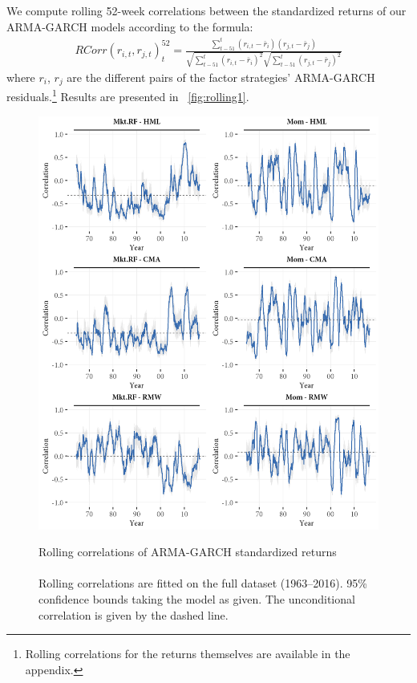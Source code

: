 We compute rolling 52-week correlations between the standardized returns of our ARMA-GARCH models according to the formula: 
\begin{align}
    RCorr(r_{i, t}, r_{j, t})_t^{52} = \frac{\sum^{t}_{t-51}(r_{i, t} - \bar{r}_i)(r_{j,t} - \bar{r}_j)}{\sqrt{\sum^{t}_{t-51} (r_{i,t} - \bar{r}_i)^2} \sqrt{\sum^{t}_{t-51} (r_{j,t} - \bar{r}_j)^2}}
\end{align}
where $r_i$, $r_j$ are the different pairs of the factor strategies' ARMA-GARCH residuals.\footnote{Rolling correlations for the returns themselves are available in the appendix.} Results are presented in ~\autoref{fig:rolling1}.
\begin{figure}[!ht]
  \centering
  \caption{Rolling correlations of ARMA-GARCH standardized returns \\ \quad \\
   Rolling correlations are fitted on the full dataset (1963--2016). 95\% confidence bounds taking the model as given. The unconditional correlation is given by the dashed line.}
  \includegraphics[scale=1]{graphics/rolling1.png}
  \label{fig:rolling1}
\end{figure}
